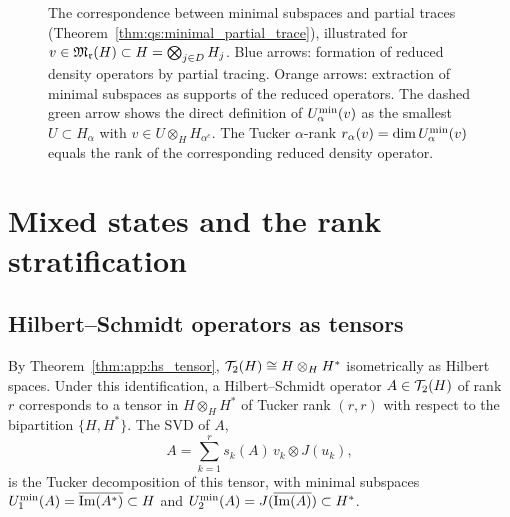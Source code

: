 \begin{figure}[ht]
\caption{The correspondence between minimal subspaces and partial traces
(Theorem~\ref{thm:qs:minimal_partial_trace}), illustrated for
$v \in \mathfrak{M}_{\mathfrak{r}}(H) \subset H = \bigotimes_{j \in D} H_j$.
Blue arrows: formation of reduced density operators by partial tracing.
Orange arrows: extraction of minimal subspaces as supports of the
reduced operators. The dashed green arrow shows the direct definition
of $U^{\min}_{\alpha}(v)$ as the smallest $U \subset H_\alpha$ with
$v \in U \otimes_H H_{\alpha^c}$.
The Tucker $\alpha$-rank $r_\alpha(v) = \dim U^{\min}_{\alpha}(v)$ equals
the rank of the corresponding reduced density operator.}
\label{fig:minimal_partial_trace}
\end{figure}

\section{Mixed states and the rank stratification}
\label{sec:qs:mixed}

\subsection*{Hilbert--Schmidt operators as tensors}

By Theorem~\ref{thm:app:hs_tensor}, $\mathcal{T}_{2}(H) \cong H \otimes_H H^*$
isometrically as Hilbert spaces. Under this identification, a
Hilbert--Schmidt operator $A \in \mathcal{T}_{2}(H)$ of rank $r$ corresponds
to a tensor in $H \otimes_H H^*$ of Tucker rank $(r, r)$ with respect
to the bipartition $\{H, H^*\}$. The SVD of $A$,
\begin{equation*}
    A = \sum_{k=1}^r s_k(A)\, v_k \otimes J(u_k),
\end{equation*}
is the Tucker decomposition of this tensor, with minimal subspaces
$U^{\min}_{1}(A) = \overline{\mathrm{Im}(A^*)} \subset H$ and
$U^{\min}_{2}(A) = J(\overline{\mathrm{Im}(A)}) \subset H^*$.

